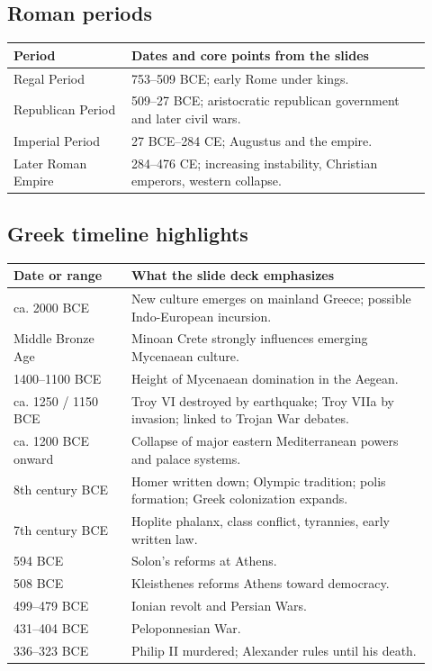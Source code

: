 \documentclass[11pt]{article}
\begin{document}
\subsection*{Roman periods}
\begin{tabular}{@{}p{0.26\linewidth}p{0.66\linewidth}@{}}
\toprule
\textbf{Period} & \textbf{Dates and core points from the slides} \\
\midrule
Regal Period & 753--509 BCE; early Rome under kings. \\
Republican Period & 509--27 BCE; aristocratic republican government and later civil wars. \\
Imperial Period & 27 BCE--284 CE; Augustus and the empire. \\
Later Roman Empire & 284--476 CE; increasing instability, Christian emperors, western collapse. \\
\bottomrule
\end{tabular}

\subsection*{Greek timeline highlights}
\begin{tabular}{@{}p{0.26\linewidth}p{0.66\linewidth}@{}}
\toprule
\textbf{Date or range} & \textbf{What the slide deck emphasizes} \\
\midrule
ca. 2000 BCE & New culture emerges on mainland Greece; possible Indo-European incursion. \\
Middle Bronze Age & Minoan Crete strongly influences emerging Mycenaean culture. \\
1400--1100 BCE & Height of Mycenaean domination in the Aegean. \\
ca. 1250 / 1150 BCE & Troy VI destroyed by earthquake; Troy VIIa by invasion; linked to Trojan War debates. \\
ca. 1200 BCE onward & Collapse of major eastern Mediterranean powers and palace systems. \\
8th century BCE & Homer written down; Olympic tradition; polis formation; Greek colonization expands. \\
7th century BCE & Hoplite phalanx, class conflict, tyrannies, early written law. \\
594 BCE & Solon's reforms at Athens. \\
508 BCE & Kleisthenes reforms Athens toward democracy. \\
499--479 BCE & Ionian revolt and Persian Wars. \\
431--404 BCE & Peloponnesian War. \\
336--323 BCE & Philip II murdered; Alexander rules until his death. \\
\bottomrule
\end{tabular}
\end{document}
